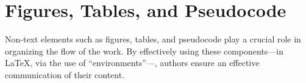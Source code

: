 
\chapter{Figures, Tables, and Pseudocode}
\label{ch:nontextelements}

Non-text elements such as figures, tables, and pseudocode play a crucial role in organizing the flow of the work.
By effectively using these components---in \LaTeX{}, via the use of ``environments''---, authors ensure an effective communication of their content.













